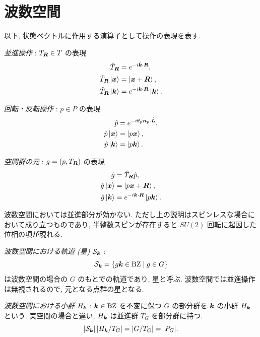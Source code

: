 \section{波数空間}

以下, 状態ベクトルに作用する演算子として操作の表現を表す.

\emph{並進操作} : $T_{\bm{R}} \in T$ の表現
\begin{align}
 \hat{T}_{\bm{R}} &= e^{-i \hat{\bm{k}} \cdot \bm{R}}, \\
 \hat{T}_{\bm{R}} \ket{\bm{x}} &= \ket{\bm{x} + \bm{R}}, \\
 \hat{T}_{\bm{R}} \ket{\bm{k}} &= e^{-i \bm{k} \cdot \bm{R}} \ket{\bm{k}}.
\end{align}

\emph{回転・反転操作} : $p \in P$ の表現
\begin{align}
 \hat{p} &= e^{-i \theta_p \bm{n}_p \cdot \hat{\bm{L}}}, \\
 \hat{p} \ket{\bm{x}} &= \ket{p \bm{x}}, \\
 \hat{p} \ket{\bm{k}} &= \ket{p \bm{k}}.
\end{align}

\emph{空間群の元} : $g = (p, T_{\bm{R}})$ の表現
\begin{align}
 \hat{g} &= \hat{T}_{\bm{R}} \hat{p}, \\
 \hat{g} \ket{\bm{x}} &= \ket{p \bm{x} + \bm{R}}, \\
 \hat{g} \ket{\bm{k}} &= e^{-i \bm{k} \cdot \bm{R}} \ket{p \bm{k}}.
\end{align}

波数空間においては並進部分が効かない.
ただし上の説明はスピンレスな場合において成り立つものであり, 半整数スピンが存在すると $SU(2)$ 回転に起因した位相の項が現れる.

\emph{波数空間における軌道 (星)} $\mathcal{S}_{\bm{k}}$ :
\begin{equation}
 \mathcal{S}_{\bm{k}} = \{ g \bm{k} \in \mathrm{BZ} \mid g \in G \}
\end{equation}
は波数空間の場合の $G$ のもとでの軌道であり, 星と呼ぶ. 波数空間では並進操作は無視されるので, 元となる点群の星となる.

\emph{波数空間における小群} $H_{\bm{k}}$ : $\bm{k} \in \mathrm{BZ}$ を不変に保つ $G$ の部分群を $\bm{k}$ の小群 $H_{\bm{k}}$ という. 実空間の場合と違い, $H_{\bm{k}}$ は並進群 $T_G$ を部分群に持つ.
\begin{equation}
 |\mathcal{S}_{\bm{k}}|\,|H_{\bm{k}} / T_G| = |G / T_G| = |P_G|.
\end{equation}